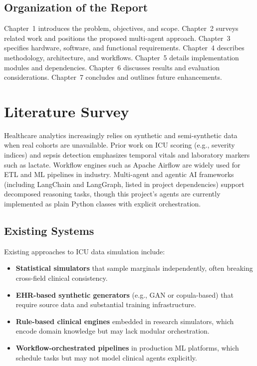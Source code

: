 \documentclass[12pt]{report}
\begin{document}
\section{Organization of the Report}

Chapter~1 introduces the problem, objectives, and scope. Chapter~2 surveys related work and positions the proposed multi-agent approach. Chapter~3 specifies hardware, software, and functional requirements. Chapter~4 describes methodology, architecture, and workflows. Chapter~5 details implementation modules and dependencies. Chapter~6 discusses results and evaluation considerations. Chapter~7 concludes and outlines future enhancements.

\newpage

\chapter{Literature Survey}

Healthcare analytics increasingly relies on synthetic and semi-synthetic data when real cohorts are unavailable. Prior work on ICU scoring (e.g., severity indices) and sepsis detection emphasizes temporal vitals and laboratory markers such as lactate. Workflow engines such as Apache Airflow are widely used for ETL and ML pipelines in industry. Multi-agent and agentic AI frameworks (including LangChain and LangGraph, listed in project dependencies) support decomposed reasoning tasks, though this project's agents are currently implemented as plain Python classes with explicit orchestration.

\section{Existing Systems}

Existing approaches to ICU data simulation include:
\begin{itemize}[noitemsep]
    \item \textbf{Statistical simulators} that sample marginals independently, often breaking cross-field clinical consistency.
    \item \textbf{EHR-based synthetic generators} (e.g., GAN or copula-based) that require source data and substantial training infrastructure.
    \item \textbf{Rule-based clinical engines} embedded in research simulators, which encode domain knowledge but may lack modular orchestration.
    \item \textbf{Workflow-orchestrated pipelines} in production ML platforms, which schedule tasks but may not model clinical agents explicitly.
\end{itemize}
\end{document}
